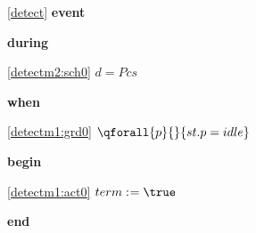 \noindent \ref{detect}  \textbf{event}
\begin{block}
  \item   \textbf{during}
  \begin{block}
  \item[ \eqref{detectm2:sch0} ]{$d = Pcs $} %
  \end{block}
  \item   \textbf{when}
  \begin{block}
  \item[ \eqref{detectm1:grd0} ]{$\qforall{p}{}{st.p = idle} $} %
  \end{block}
  \item   \textbf{begin}
  \begin{block}
  \item[ \eqref{detectm1:act0} ]{$term \bcmeq \true$} %
  \end{block}
  \item   \textbf{end} \\
\end{block}
